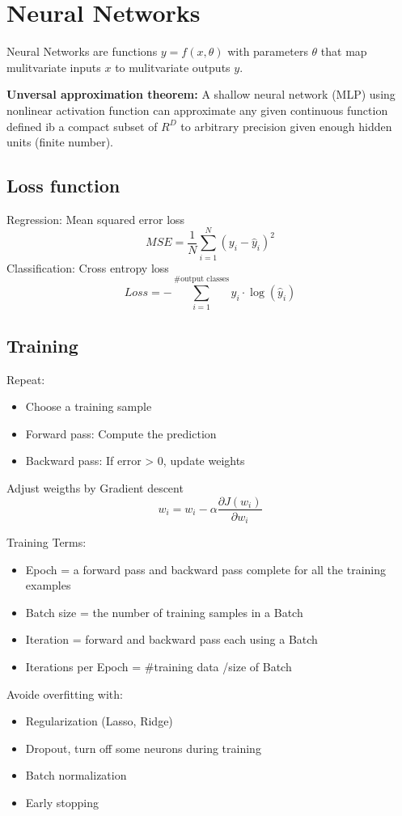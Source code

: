 \section{Neural Networks}
Neural Networks are functions \(y = f(x,\theta)\) with parameters \(\theta\) that map mulitvariate inputs \(x\) to mulitvariate outputs \(y\).

\textbf{Unversal approximation theorem:} A shallow neural network (MLP) using nonlinear activation function can approximate any given continuous function defined ib a compact subset of \(R^D\) to arbitrary precision given enough hidden units (finite number).

\subsection{Loss function}
Regression: Mean squared error loss
\[
MSE = \frac{1}{N}\sum_{i=1}^{N}(y_i- \hat{y}_i)^2
\]
Classification: Cross entropy loss
\[
Loss = -\sum_{i= 1}^{\text{\#output classes}}y_i \cdot \log(\hat{y}_i)
\]
\subsection{Training}
Repeat:
\begin{itemize}
    \item Choose a training sample
    \item Forward pass: Compute the prediction
    \item Backward pass: If error > 0, update weights
\end{itemize}
Adjust weigths by Gradient descent
\[
w_i = w_i - \alpha\frac{\partial J(w_i)}{\partial w_i}
\]

Training Terms:
\begin{itemize}
    \item Epoch = a forward pass and backward pass complete for all the training examples
    \item Batch size = the number of training samples in a Batch
    \item Iteration = forward and backward pass each using a Batch
    \item Iterations per Epoch = \#training data /size of Batch
\end{itemize}
 Avoide overfitting with:
 \begin{itemize}
    \item Regularization (Lasso, Ridge)
    \item Dropout, turn off some neurons during training
    \item Batch normalization
    \item Early stopping
 \end{itemize}

